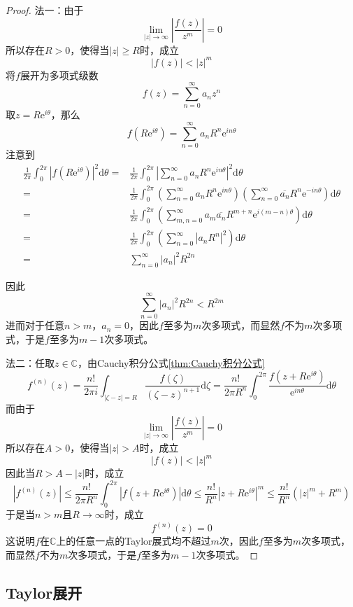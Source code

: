 \documentclass[lang = cn, scheme = chinese, thmcnt = section]{elegantbook}
\newcommand{\C}{\mathbb{C}}  		   %
\begin{document}
\begin{proof}
	法一：由于
	$$
	\lim_{|z|\to\infty}\left| \frac{f(z)}{z^m} \right|=0
	$$
	所以存在$R>0$，使得当$|z|\ge R$时，成立
	$$
	|f(z)|<|z|^m
	$$
	将$f$展开为多项式级数
	$$
	f(z)=\sum_{n=0}^{\infty}{a_nz^n}
	$$
	取$z=R\mathrm{e}^{i\theta}$，那么
	$$
	f(R\mathrm{e}^{i\theta})=\sum_{n=0}^{\infty}{a_nR^n\mathrm{e}^{in\theta}}
	$$
	注意到
	\begin{align*}
		\frac{1}{2\pi}\int_0^{2\pi}{|f(R\mathrm{e}^{i\theta})|^2\mathrm{d}\theta}
		=&\frac{1}{2\pi}\int_0^{2\pi}{\left|\sum_{n=0}^{\infty}{a_nR^n\mathrm{e}^{in\theta}}\right|^2\mathrm{d}\theta}\\
		=&\frac{1}{2\pi}\int_0^{2\pi}{\left(\sum_{n=0}^{\infty}{a_nR^n\mathrm{e}^{in\theta}}\right)\left(\sum_{n=0}^{\infty}{\overline{a_n}R^n\mathrm{e}^{-in\theta}}\right)\mathrm{d}\theta}\\
		=&\frac{1}{2\pi}\int_0^{2\pi}{\left(\sum_{m,n=0}^{\infty}{a_m\overline{a_n}R^{m+n}\mathrm{e}^{i(m-n)\theta}}\right)\mathrm{d}\theta}\\
		=&\frac{1}{2\pi}\int_0^{2\pi}{\left(\sum_{n=0}^{\infty}{|a_nR^n|^2}\right)\mathrm{d}\theta}\\
		=&\sum_{n=0}^{\infty}{|a_n|^2R^{2n}}
	\end{align*}
	
	因此
	$$
	\sum_{n=0}^{\infty}{|a_n|^2R^{2n}}<R^{2m}
	$$
	进而对于任意$n>m$，$a_n=0$，因此$f$至多为$m$次多项式，而显然$f$不为$m$次多项式，于是$f$至多为$m-1$次多项式。
	
	法二：任取$z\in\C$，由Cauchy积分公式\ref{thm:Cauchy积分公式}
	$$
	f^{(n)}(z)
	=\frac{n!}{2\pi i}\int_{|\zeta-z|=R}\frac{f(\zeta)}{(\zeta-z)^{n+1}}\mathrm{d}\zeta
	=\frac{n!}{2\pi R^n}\int_0^{2\pi }\frac{f(z+R\mathrm{e}^{i\theta})}{\mathrm{e}^{in\theta}}\mathrm{d}\theta
	$$
	而由于
	$$
	\lim_{|z|\to\infty}\left| \frac{f(z)}{z^m} \right|=0
	$$
	所以存在$A>0$，使得当$|z|> A$时，成立
	$$
	|f(z)|<|z|^m
	$$
	因此当$R>A-|z|$时，成立
	$$
	\left|f^{(n)}(z)\right|
	\le\frac{n!}{2\pi R^n}\int_0^{2\pi}|f(z+R\mathrm{e}^{i\theta})|\mathrm{d}\theta
	\le \frac{n!}{R^n}|z+R\mathrm{e}^{i\theta}|^m
	\le \frac{n!}{R^n}(|z|^m+R^m)
	$$
	于是当$n>m$且$R\to\infty$时，成立
	$$
	f^{(n)}(z)=0
	$$
	这说明$f$在$\C$上的任意一点的Taylor展式均不超过$m$次，因此$f$至多为$m$次多项式，而显然$f$不为$m$次多项式，于是$f$至多为$m-1$次多项式。
\end{proof}

\subsection{Taylor展开}
\end{document}
